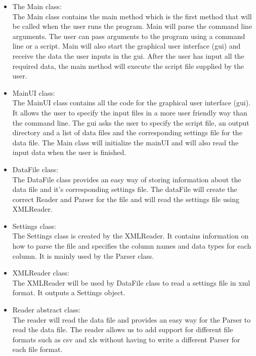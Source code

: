 \documentclass[11pt,twoside,a4paper]{article}
\begin{document}
\begin{itemize}
\item The Main class:\\
The Main class contains the main method which is the first method that will be called when the user runs the program. Main will parse the command line arguments. The user can pass arguments to the program using a command line or a script. Main will also start the graphical user interface (gui) and receive the data the user inputs in the gui. After the user has input all the required data, the main method will execute the script file supplied by the user.

\item MainUI class:\\
The MainUI class contains all the code for the graphical user interface (gui). It allows the user to specify the input files in a more user friendly way than the command line. The gui asks the user to specify the script file, an output directory and a list of data files and the corresponding settings file for the data file. The Main class will initialize the mainUI and will also read the input data when the user is finished.

\item DataFile class:\\
The DataFile class provides an easy way of storing information about the data file and it's corresponding settings file. The dataFile will create  the correct Reader and Parser for the file and will read the settings file using XMLReader.

\item Settings class:\\
The Settings class is created by the XMLReader. It contains information on how to parse the file and specifies the column names and data types for each column. It is mainly used by the Parser class.

\item XMLReader class:\\
The XMLReader will be used by DataFile class to read a settings file in xml format. It outputs a Settings object.

\item Reader abstract class:\\
The reader will read the data file and provides an easy way for the Parser to read the data file. The reader allows us to add support for different file formats such as csv and xls without having to write a different Parser for each file format.


\end{itemize}
\end{document}
